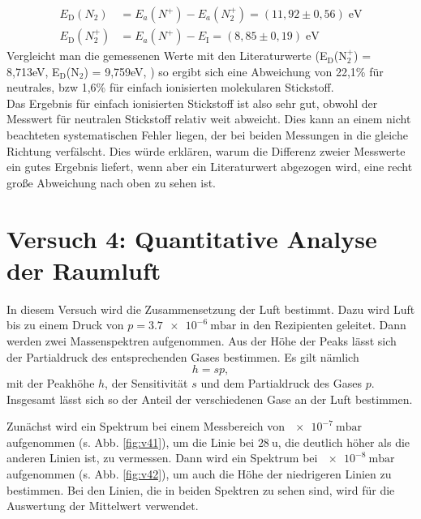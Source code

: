 \begin{align}
	E_\textrm{D}(N_2) &= E_a(N^+) - E_a(N_2^+) = (11,92\pm 0,56)\;\textrm{eV}\\
	E_\textrm{D}(N_2^+) &= E_a(N^+) - E_\textrm{I} = (8,85\pm 0,19)\;\textrm{eV}
\end{align}
Vergleicht man die gemessenen Werte mit den Literaturwerte (E$_\textrm{D}$(N$_2^+$) = 8,713\;eV, E$_\textrm{D}$(N$_2$) = 9,759\;eV, \cite{kobra}) so
ergibt sich eine Abweichung von 22,1\% für neutrales, bzw 1,6\% für einfach ionisierten molekularen Stickstoff.\\
Das Ergebnis für einfach ionisierten Stickstoff ist also sehr gut, obwohl der Messwert für neutralen Stickstoff relativ weit abweicht. Dies kann an einem nicht beachteten systematischen Fehler liegen, der bei beiden Messungen in die gleiche Richtung verfälscht. Dies würde erklären, warum die Differenz zweier Messwerte ein gutes Ergebnis liefert, wenn aber ein Literaturwert abgezogen wird, eine recht große Abweichung nach oben zu sehen ist.\\

\section{Versuch 4: Quantitative Analyse der Raumluft}

In diesem Versuch wird die Zusammensetzung der Luft bestimmt. Dazu wird Luft bis zu einem Druck von $p=\SI{3,7e-6}{\milli\bar}$ in den Rezipienten geleitet. Dann werden zwei Massenspektren aufgenommen. Aus der Höhe der Peaks lässt sich der Partialdruck des entsprechenden Gases bestimmen. Es gilt nämlich
\begin{equation}
 h = sp,
\end{equation}
mit der Peakhöhe $h$, der Sensitivität $s$ und dem Partialdruck des Gases $p$. Insgesamt lässt sich so der Anteil der verschiedenen Gase an der Luft bestimmen.

Zunächst wird ein Spektrum bei einem Messbereich von $\SI{e-7}{\milli\bar}$ aufgenommen (s. Abb. \ref{fig:v41}), um die Linie bei $\SI{28}{\amu}$, die deutlich höher als die anderen Linien ist, zu vermessen. Dann wird ein Spektrum bei $\SI{e-8}{\milli\bar}$ aufgenommen (s. Abb. \ref{fig:v42}), um auch die Höhe der niedrigeren Linien zu bestimmen.
Bei den Linien, die in beiden Spektren zu sehen sind, wird für die Auswertung der Mittelwert verwendet.

